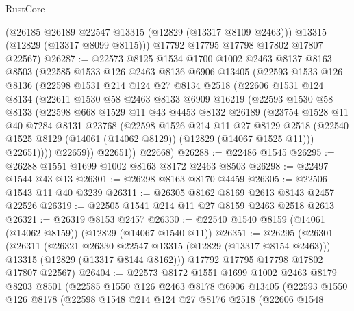 \begin{lexlean}{RustCore}
\begin{coremodule}
        (@26185 @26189 @22547 @13315 (@12829 (@13317 @8109 @2463)))
        @13315
        (@12829 (@13317 @8099 @8115)))
      @17792
      @17795
      @17798
      @17802
      @17807
      @22567)
@26287 := @22573
    @8125
    @1534
    @1700
    @1002
    @2463
    @8137
    @8163
    @8503
    (@22585
      @1533
      @126
      @2463
      @8136
      @6906
      @13405
      (@22593
        @1533
        @126
        @8136
        (@22598
          @1531
          @214
          @124
          @27
          @8134
          @2518
          (@22606
            @1531
            @124
            @8134
            (@22611
              @1530
              @58
              @2463
              @8133
              @6909
              @16219
              (@22593
                @1530
                @58
                @8133
                (@22598
                  @668
                  @1529
                  @11
                  @43
                  @4453
                  @8132
                  @26189
                  (@23754
                    @1528
                    @11
                    @40
                    @7284
                    @8131
                    @23768
                    (@22598
                      @1526
                      @214
                      @11
                      @27
                      @8129
                      @2518
                      (@22540 @1525 @8129 (@14061 (@14062 @8129)) (@12829 (@14067 @1525 @11)))
                      @22651))))
              @22659))
          @22651))
      @22668)
@26288 := @22486 @1545
@26295 := @26288 @1551 @1699 @1002 @8163 @8172 @2463 @8503
@26298 := @22497 @1544 @43 @13
@26301 := @26298 @8163 @8170 @4459
@26305 := @22506 @1543 @11 @40 @3239
@26311 := @26305 @8162 @8169 @2613 @8143 @2457 @22526
@26319 := @22505 @1541 @214 @11 @27 @8159 @2463 @2518 @2613
@26321 := @26319 @8153 @2457
@26330 := @22540 @1540 @8159 (@14061 (@14062 @8159)) (@12829 (@14067 @1540 @11))
@26351 := @26295
    (@26301
      (@26311
        (@26321 @26330 @22547 @13315 (@12829 (@13317 @8154 @2463)))
        @13315
        (@12829 (@13317 @8144 @8162)))
      @17792
      @17795
      @17798
      @17802
      @17807
      @22567)
@26404 := @22573
    @8172
    @1551
    @1699
    @1002
    @2463
    @8179
    @8203
    @8501
    (@22585
      @1550
      @126
      @2463
      @8178
      @6906
      @13405
      (@22593
        @1550
        @126
        @8178
        (@22598
          @1548
          @214
          @124
          @27
          @8176
          @2518
          (@22606
            @1548

\end{coremodule}
\end{lexlean}
